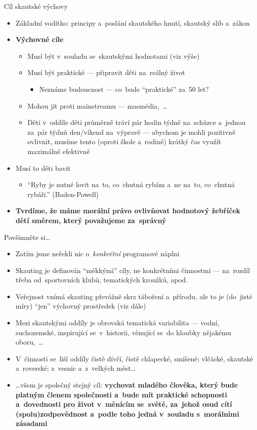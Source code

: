 \documentclass[compress, ucs, xelatex, 11pt, xcolor=dvipsnames, print, aspectratio=169,
	hyperref={
		bookmarks=true,
		unicode=true,
		colorlinks=true,
		pdftitle={Skautska vychovna metoda},
		plainpages=false,
		pdfauthor={Vojtech Zeisek},
		pdfsubject={Skautska vychovna metoda a jeji vyvoj za posledni stoleti a desetileti},
		pdfcreator={XeLaTeX},
		pdfkeywords={Junak, Pedagogika, Skaut, Skauting, Vychovna metoda},
		linkcolor=Red, %
		anchorcolor=ForestGreen, %
		citecolor=ForestGreen, %
		filecolor=ForestGreen, %
		menucolor=ForestGreen, %
		urlcolor=Sepia, %
		pdftex},
	url={hyphens, lowtilde} %
	]{beamer}
\begin{document}
\begin{frame}{Cíl skautské výchovy}
	\begin{itemize}
		\item Základní vodítko: principy a~poslání skautského hnutí, skautský slib a~zákon
		\item \textbf{Výchovné cíle}
		\begin{itemize}
			\item Musí být v~souladu se~skautskými hodnotami (viz výše)
			\item Musí být praktické --- připravit děti na~reálný život
			\begin{itemize}
		\item Neznáme budoucnost --- co~bude \enquote{praktické} za~50 let?
			\end{itemize}
			\item Mohou jít proti mainstreamu --- masmédia,~\ldots
			\item Děti v~oddíle děti průměrně tráví pár hodin týdně na~schůzce a~jednou za~pár týdnů den/víkend na~výpravě --- abychom je mohli pozitivně ovlivnit, musíme tento (oproti škole a~rodině) krátký čas využít maximálně efektivně
		\end{itemize}
		\item Musí to děti bavit
			\begin{itemize}
		\item \enquote{Ryby je nutné lovit na~to, co~chutná rybám a~ne na~to, co~chutná rybáři.} (Baden-Powell)
			\end{itemize}
		\item \textbf{Tvrdíme, že máme morální právo ovlivňovat hodnotový žebříček dětí směrem, který považujeme za~správný}
	\end{itemize}
\end{frame}

\begin{frame}{Povšimněte si\ldots}
	\begin{itemize}
		\item Zatím jsme neřekli nic o~\textit{konkrétní} programové náplni
		\item Skauting je definován \enquote{měkkými} cíly, ne konkrétními činnostmi --- na~rozdíl třeba od~sportovních klubů, tematických kroužků, apod.
		\item Veřejnost vnímá skauting převážně skrz táboření a~přírodu, ale to je (do~jisté míry) \enquote{jen} výchovný prostředek (viz dále)
		\item Mezi skautskými oddíly je obrovská tematická variabilita --- vodní, suchozemské, inspirující se~v~historii, věnující se~do hloubky nějakému oboru,~\ldots
		\item V~činnosti se~liší oddíly čistě dívčí, čistě chlapecké, smíšené; vlčácké, skautské a~roverské; z~vesnic a~z~velkých měst\ldots
		\item \ldots všem je společný stejný \alert{cíl}: \textbf{vychovat mladého člověka, který bude platným členem společnosti a~bude mít praktické schopnosti a~dovednosti pro život v~měnícím se~světě, za~jehož osud cítí (spolu)zodpovědnost a~podle toho jedná v~souladu s~morálními zásadami}
	\end{itemize}
\end{frame}
\end{document}
